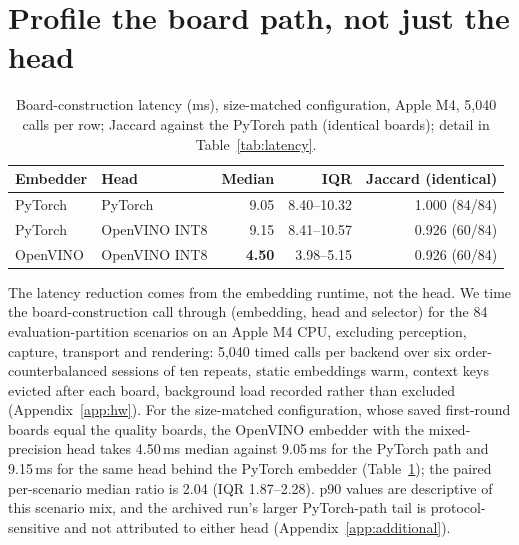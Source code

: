 \section{Profile the board path, not just the head}\label{sec:latency}
\begin{table}[t]
\centering\footnotesize\renewcommand{\arraystretch}{0.9}\setlength{\tabcolsep}{5pt}\setlength{\belowcaptionskip}{3pt}
\caption{Board-construction latency (ms), size-matched configuration, Apple M4, 5,040 calls per row; Jaccard against the PyTorch path (identical boards); detail in Table~\ref{tab:latency}.}
\label{tab:latencymain}
\begin{tabular}{llrrr}
\toprule
Embedder & Head & Median & IQR & Jaccard (identical)\\
\midrule
PyTorch & PyTorch & 9.05 & 8.40--10.32 & 1.000 (84/84)\\
PyTorch & OpenVINO INT8 & 9.15 & 8.41--10.57 & 0.926 (60/84)\\
OpenVINO & OpenVINO INT8 & \textbf{4.50} & 3.98--5.15 & 0.926 (60/84)\\
\bottomrule
\end{tabular}
\end{table}
The latency reduction comes from the embedding runtime, not the head. We time the board-construction call through  (embedding, head and selector) for the 84 evaluation-partition scenarios on an Apple M4 CPU, excluding perception, capture, transport and rendering: 5,040 timed calls per backend over six order-counterbalanced sessions of ten repeats, static embeddings warm, context keys evicted after each board, background load recorded rather than excluded (Appendix~\ref{app:hw}). For the size-matched configuration, whose saved first-round boards equal the quality boards, the OpenVINO embedder with the mixed-precision head takes 4.50\,ms median against 9.05\,ms for the PyTorch path and 9.15\,ms for the same head behind the PyTorch embedder (Table~\ref{tab:latencymain}); the paired per-scenario median ratio is 2.04 (IQR 1.87--2.28). p90 values are descriptive of this scenario mix, and the archived run's larger PyTorch-path tail is protocol-sensitive and not attributed to either head (Appendix~\ref{app:additional}). %
